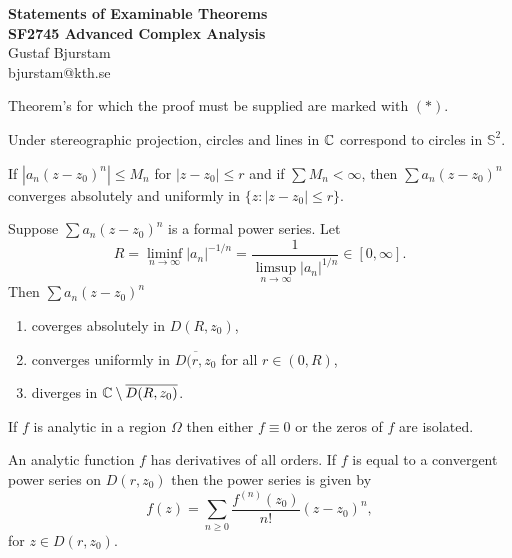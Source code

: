 \documentclass[12pt]{article}
\begin{document}
\begin{center}
\textbf{\large Statements of Examinable Theorems \\ SF2745 Advanced Complex Analysis} \\
Gustaf Bjurstam\\
bjurstam@kth.se\\
\end{center}

\begin{remark}
    Theorem's for which the proof must be supplied are marked with $(*)$.
\end{remark}

\begin{theorem}
    Under stereographic projection, circles and lines in $\mathbb{C}$ correspond to circles in $\mathbb{S}^2$.
\end{theorem}

\begin{theorem}[M test {$*$}]
    If $|a_n(z-z_0)^n|\leq M_n$ for $|z-z_0|\leq r$ and if $\sum M_n<\infty$, then $\sum a_n(z-z_0)^n$ converges absolutely and uniformly in $\{z:|z-z_0|\leq r\}$.
\end{theorem}

\begin{theorem}
    Suppose $\sum a_n(z-z_0)^n$ is a formal power series. Let
    \begin{equation*}
        R=\liminf_{n\to\infty} |a_n|^{-1/n}=\frac{1}{\limsup_{n\to\infty} |a_n|^{1/n}}\in [0, \infty].
    \end{equation*}
    Then $\sum a_n(z-z_0)^n$
    \begin{enumerate}[label=(\alph*)]
        \item coverges absolutely in $D(R,z_0)$,
        \item converges uniformly in $\overline{D(r,z_0}$ for all $r\in(0,R)$,
        \item diverges in $\mathbb{C}\setminus\overline{D(R,z_0)}$.
    \end{enumerate}
\end{theorem}

\begin{theorem}[Uniqueness $*$]
    If $f$ is analytic in a region $\Omega$ then either $f\equiv 0$ or the zeros of $f$ are isolated.
\end{theorem}

\begin{theorem}
An analytic function $f$ has derivatives of all orders. If $f$ is equal to a convergent power series on $D(r,z_0)$ then the power series is given by 
\begin{equation*}
    f(z)=\sum_{n\geq 0} \frac{f^{(n)}(z_0)}{n!}(z-z_0)^n,
\end{equation*}
for $z\in D(r,z_0)$.
\end{theorem}
\end{document}
